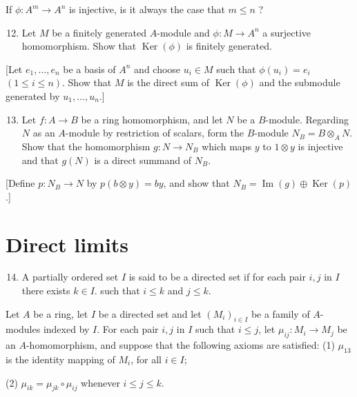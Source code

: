 \documentclass{standalone}
\theoremstyle{definition}
\theoremstyle{remark}
\begin{document}
If $\phi: A^{m} \rightarrow A^{n}$ is injective, is it always the case that $m \leqslant n$ ?

\begin{enumerate}
  \setcounter{enumi}{11}
  \item Let $M$ be a finitely generated $A$-module and $\phi: M \rightarrow A^{n}$ a surjective homomorphism. Show that $\operatorname{Ker}(\phi)$ is finitely generated.
\end{enumerate}

[Let $e_{1}, \ldots, e_{n}$ be a basis of $A^{n}$ and choose $u_{i} \in M$ such that $\phi\left(u_{i}\right)=e_{i}$ $(1 \leqslant i \leqslant n)$. Show that $M$ is the direct sum of $\operatorname{Ker}(\phi)$ and the submodule generated by $u_{1}, \ldots, u_{n}$.]

\begin{enumerate}
  \setcounter{enumi}{12}
  \item Let $f: A \rightarrow B$ be a ring homomorphism, and let $N$ be a $B$-module. Regarding $N$ as an $A$-module by restriction of scalars, form the $B$-module $N_{B}=B \otimes_{A} N$. Show that the homomorphism $g: N \rightarrow N_{B}$ which maps $y$ to $1 \otimes y$ is injective and that $g(N)$ is a direct summand of $N_{B}$.
\end{enumerate}

[Define $p: N_{B} \rightarrow N$ by $p(b \otimes y)=b y$, and show that $N_{B}=\operatorname{Im}(g) \oplus \operatorname{Ker}(p)$.]

\section{Direct limits}
\begin{enumerate}
  \setcounter{enumi}{13}
  \item A partially ordered set $I$ is said to be a directed set if for each pair $i, j$ in $I$ there exists $k \in I$. such that $i \leqslant k$ and $j \leqslant k$.
\end{enumerate}

Let $A$ be a ring, let $I$ be a directed set and let $\left(M_{i}\right)_{i \in I}$ be a family of $A$-modules indexed by $I$. For each pair $i, j$ in $I$ such that $i \leqslant j$, let $\mu_{i j}: M_{i} \rightarrow M_{j}$ be an $A$-homomorphism, and suppose that the following axioms are satisfied: (1) $\mu_{13}$ is the identity mapping of $M_{i}$, for all $i \in I$;

(2) $\mu_{i k}=\mu_{j k} \circ \mu_{i j}$ whenever $i \leqslant j \leqslant k$.
\end{document}
